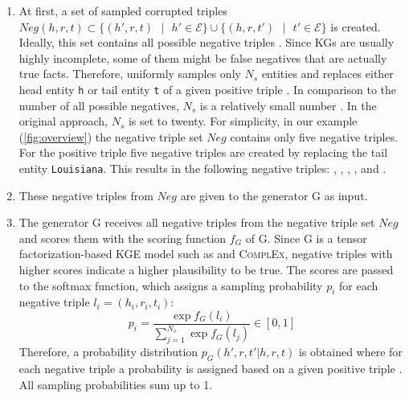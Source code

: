 \begin{enumerate}
    \item 
    At first, a set of sampled corrupted triples $Neg(h,r,t)\subset\{(h',r,t) \text{ } | \text{ } h' \in \mathcal{E}\} \cup \{(h,r,t') \text{ } | \text{ } t'\in\mathcal{E}\}$ is created.
    Ideally, this set contains all possible negative triples \cite{cai2017kbgan}.
    Since \acp{KG} are usually highly incomplete, some of them might be false negatives that are actually true facts.
    Therefore, \kbgan uniformly samples only $N_s$ entities and replaces either head entity \texttt{h} or tail entity \texttt{t} of a given positive triple .
    In comparison to the number of all possible negatives, $N_s$ is a relatively small number \cite{cai2017kbgan}.
    In the original approach, $N_s$ is set to twenty.
    For simplicity, in our example (\autoref{fig:overview}) the negative triple set   $Neg$ contains only five negative triples.
    For the positive triple  five negative triples
    are created by replacing the tail entity \texttt{Louisiana}.
    This results in the following negative triples:
    ,
    ,
    ,
    , and 
    .
    
    \item 
    These negative triples from $Neg$ are given to the generator G as input.
    
    \item 
    The generator G receives all negative triples from the negative triple set $Neg$ and scores them with the scoring function $f_G$ of G.
    Since G is a tensor factorization-based \ac{KGE} model such as \distmult and \textsc{ComplEx}, negative triples with higher scores indicate a higher plausibility to be true.
    The scores are passed to the softmax function, which assigns a sampling probability $p_i$ for each negative triple $l_i = (h_i, r_i, t_i)$:
    \begin{equation} \label{eq:origsampling}
        p_i = \frac{\exp{f_G(l_i)}}{\sum_{j=1}^{N_s}{\exp{f_G(l_j)}}} \in [0,1]
    \end{equation}
    Therefore, a probability distribution $p_G(h',r,t'|h,r,t)$ is obtained where for each negative triple  a probability is assigned based on a given positive triple . 
    All sampling probabilities sum up to 1.
    

\end{enumerate}
